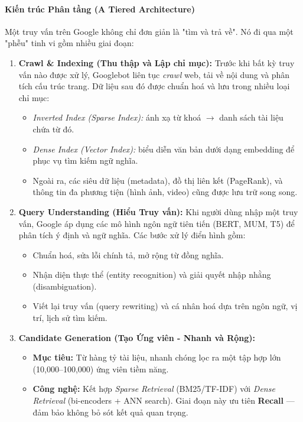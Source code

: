 \paragraph{Kiến trúc Phân tầng (A Tiered Architecture)}
Một truy vấn trên Google không chỉ đơn giản là "tìm và trả về". Nó đi qua một "phễu" tinh vi gồm nhiều giai đoạn:
\begin{enumerate}
    \item \textbf{Crawl \& Indexing (Thu thập và Lập chỉ mục):} 
    Trước khi bất kỳ truy vấn nào được xử lý, Googlebot liên tục \emph{crawl} web, tải về nội dung và phân tích cấu trúc trang. Dữ liệu sau đó được chuẩn hoá và lưu trong nhiều loại chỉ mục:
    \begin{itemize}
        \item \emph{Inverted Index (Sparse Index):} ánh xạ từ khoá $\rightarrow$ danh sách tài liệu chứa từ đó.
        \item \emph{Dense Index (Vector Index):} biểu diễn văn bản dưới dạng embedding để phục vụ tìm kiếm ngữ nghĩa.
        \item Ngoài ra, các siêu dữ liệu (metadata), đồ thị liên kết (PageRank), và thông tin đa phương tiện (hình ảnh, video) cũng được lưu trữ song song.
    \end{itemize}

    \item \textbf{Query Understanding (Hiểu Truy vấn):} 
    Khi người dùng nhập một truy vấn, Google áp dụng các mô hình ngôn ngữ tiên tiến (BERT, MUM, T5) để phân tích ý định và ngữ nghĩa. Các bước xử lý điển hình gồm:
    \begin{itemize}
        \item Chuẩn hoá, sửa lỗi chính tả, mở rộng từ đồng nghĩa.
        \item Nhận diện thực thể (entity recognition) và giải quyết nhập nhằng (disambiguation).
        \item Viết lại truy vấn (query rewriting) và cá nhân hoá dựa trên ngôn ngữ, vị trí, lịch sử tìm kiếm.
    \end{itemize}

    \item \textbf{Candidate Generation (Tạo Ứng viên - Nhanh và Rộng):}
    \begin{itemize}
        \item \textbf{Mục tiêu:} Từ hàng tỷ tài liệu, nhanh chóng lọc ra một tập hợp lớn (10,000--100,000) ứng viên tiềm năng.
        \item \textbf{Công nghệ:} Kết hợp \emph{Sparse Retrieval} (BM25/TF-IDF) với \emph{Dense Retrieval} (bi-encoders + ANN search). Giai đoạn này ưu tiên \textbf{Recall} --- đảm bảo không bỏ sót kết quả quan trọng.
    \end{itemize}


\end{enumerate}

